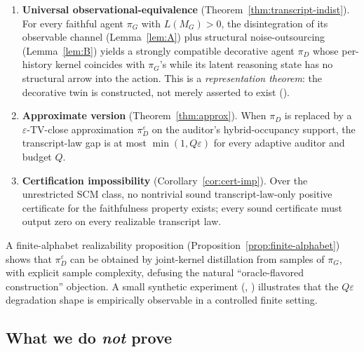 \documentclass{article}
\theoremstyle{plain}
\theoremstyle{definition}
\theoremstyle{remark}
\begin{document}
\begin{enumerate}
  \item \textbf{Universal observational-equivalence}
    (Theorem~\ref{thm:transcript-indist}). For every faithful agent $\pi_G$
    with $L(M_G) > 0$, the disintegration of its observable channel
    (Lemma~\ref{lem:A}) plus structural noise-outsourcing
    (Lemma~\ref{lem:B}) yields a strongly compatible decorative agent
    $\pi_D$ whose per-history kernel coincides with $\pi_G$'s while its
    latent reasoning state has no structural arrow into the action. This
    is a \emph{representation theorem}: the decorative twin is constructed,
    not merely asserted to exist ().
  \item \textbf{Approximate version} (Theorem~\ref{thm:approx}). When $\pi_D$
    is replaced by a $\varepsilon$-TV-close approximation $\pi_D^\varepsilon$
    on the auditor's hybrid-occupancy support, the transcript-law gap is at
    most $\min(1, Q\varepsilon)$ for every adaptive auditor and budget $Q$.
  \item \textbf{Certification impossibility}
    (Corollary~\ref{cor:cert-imp}). Over the unrestricted SCM class, no
    nontrivial sound transcript-law-only positive certificate for the
    faithfulness property exists; every sound certificate must output
    zero on every realizable transcript law.
\end{enumerate}

A finite-alphabet realizability proposition
(Proposition~\ref{prop:finite-alphabet}) shows that $\pi_D^\varepsilon$ can
be obtained by joint-kernel distillation from samples of $\pi_G$, with
explicit sample complexity, defusing the natural ``oracle-flavored
construction'' objection. A small synthetic experiment
(, ) illustrates that the
$Q\varepsilon$ degradation shape is empirically observable in a controlled
finite setting.

\subsection{What we do \emph{not} prove}
\end{document}
